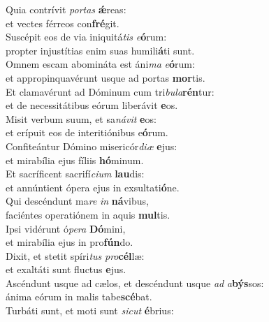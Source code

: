 \evenverse Quia contrívit \textit{por}\textit{tas} \textbf{ǽ}reas:~\*\\
\evenverse et vectes férreos con\textbf{fré}git.\\
\oddverse Suscépit eos de via iniquitá\textit{tis} \textit{e}\textbf{ó}rum:~\*\\
\oddverse propter injustítias enim suas humili\textbf{á}ti sunt.\\
\evenverse Omnem escam abomináta est áni\textit{ma} \textit{e}\textbf{ó}rum:~\*\\
\evenverse et appropinquavérunt usque ad portas \textbf{mor}tis.\\
\oddverse Et clamavérunt ad Dóminum cum tri\textit{bu}\textit{la}\textbf{rén}tur:~\*\\
\oddverse et de necessitátibus eórum liberávit \textbf{e}os.\\
\evenverse Misit verbum suum, et sa\textit{ná}\textit{vit} \textbf{e}os:~\*\\
\evenverse et erípuit eos de interitiónibus e\textbf{ó}rum.\\
\oddverse Confiteántur Dómino misericór\textit{di}\textit{æ} \textbf{e}jus:~\*\\
\oddverse et mirabília ejus fíliis \textbf{hó}minum.\\
\evenverse Et sacríficent sacrifí\textit{ci}\textit{um} \textbf{lau}dis:~\*\\
\evenverse et annúntient ópera ejus in exsultati\textbf{ó}ne.\\
\oddverse Qui descéndunt ma\textit{re} \textit{in} \textbf{ná}vibus,~\*\\
\oddverse faciéntes operatiónem in aquis \textbf{mul}tis.\\
\evenverse Ipsi vidérunt ó\textit{pe}\textit{ra} \textbf{Dó}mini,~\*\\
\evenverse et mirabília ejus in pro\textbf{fún}do.\\
\oddverse Dixit, et stetit spíri\textit{tus} \textit{pro}\textbf{cél}læ:~\*\\
\oddverse et exaltáti sunt fluctus \textbf{e}jus.\\
\evenverse Ascéndunt usque ad cælos, et descéndunt usque \textit{ad} \textit{a}\textbf{býs}sos:~\*\\
\evenverse ánima eórum in malis tabe\textbf{scé}bat.\\
\oddverse Turbáti sunt, et moti sunt \textit{si}\textit{cut} \textbf{é}brius:~\*\\
